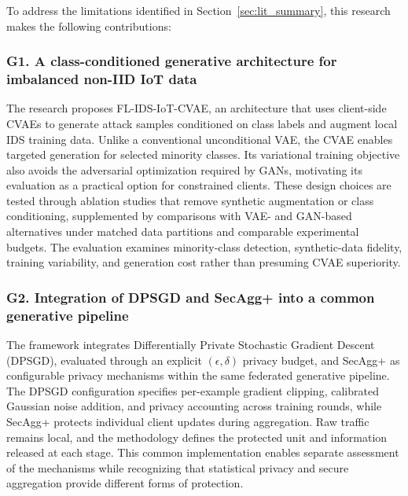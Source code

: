To address the limitations identified in Section~\ref{sec:lit_summary}, this research makes the following contributions:

\subsubsection*{G1. A class-conditioned generative architecture for imbalanced non-IID IoT data}
The research proposes FL-IDS-IoT-CVAE, an architecture that uses client-side CVAEs to generate attack samples conditioned on class labels and augment local IDS training data. Unlike a conventional unconditional VAE, the CVAE enables targeted generation for selected minority classes. Its variational training objective also avoids the adversarial optimization required by GANs, motivating its evaluation as a practical option for constrained clients. These design choices are tested through ablation studies that remove synthetic augmentation or class conditioning, supplemented by comparisons with VAE- and GAN-based alternatives under matched data partitions and comparable experimental budgets. The evaluation examines minority-class detection, synthetic-data fidelity, training variability, and generation cost rather than presuming CVAE superiority.

\subsubsection*{G2. Integration of DPSGD and SecAgg+ into a common generative pipeline}
The framework integrates Differentially Private Stochastic Gradient Descent (DPSGD), evaluated through an explicit $(\epsilon, \delta)$ privacy budget, and SecAgg+ as configurable privacy mechanisms within the same federated generative pipeline. The DPSGD configuration specifies per-example gradient clipping, calibrated Gaussian noise addition, and privacy accounting across training rounds, while SecAgg+ protects individual client updates during aggregation. Raw traffic remains local, and the methodology defines the protected unit and information released at each stage. This common implementation enables separate assessment of the mechanisms while recognizing that statistical privacy and secure aggregation provide different forms of protection.

